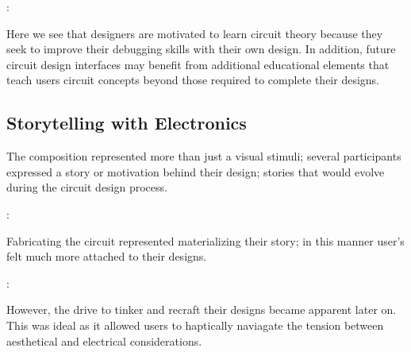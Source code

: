 \documentclass{sigchi}
\begin{document}
  \begin{myquote}
   \vspace{-2pt}
    :
    \vspace{-2pt}
  \end{myquote}
  
  Here we see that designers are motivated to learn circuit theory because they seek to improve their debugging skills with their own design. In addition, future circuit design interfaces may benefit from additional educational elements that teach users circuit concepts beyond those required to complete their designs.
  
  \subsection{Storytelling with Electronics}
  The composition represented more than just a visual stimuli; several participants expressed a story or motivation behind their design; stories that would evolve during the circuit design process.
  \begin{myquote}
   \vspace{-2pt}
    :
    \vspace{-2pt}
  \end{myquote}
  Fabricating the circuit represented materializing their story; in this manner user's felt much more attached to their designs.
  
  \begin{myquote}
   \vspace{-2pt}
    :
    \vspace{-2pt}
  \end{myquote}
  
  However, the drive to tinker and recraft their designs became apparent later on. This was ideal as it allowed users to haptically naviagate the tension between aesthetical and electrical considerations.
  
\end{document}
